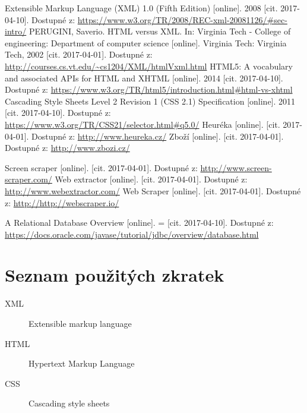 \documentclass[thesis=B,czech]{FITthesis}[2012/06/26]
\begin{document}
\begin{thebibliography}{}

	{Extensible Markup Language (XML) 1.0 (Fifth Edition) [online]. 2008 [cit. 2017-04-10]. 
	Dostupné z:
	\url{ https://www.w3.org/TR/2008/REC-xml-20081126/#sec-intro/}
	}
	{PERUGINI, Saverio. HTML versus XML. 
	In: Virginia Tech - College of engineering: Department of computer science [online]. 
	Virginia Tech: Virginia Tech, 2002 [cit. 2017-04-01]. Dostupné z: 
	\url{http://courses.cs.vt.edu/~cs1204/XML/htmlVxml.html}
	}
	{
	HTML5: A vocabulary and associated APIs for HTML and XHTML [online]. 2014 [cit. 2017-04-10]. 
	Dostupné z: 
	\url{https://www.w3.org/TR/html5/introduction.html#html-vs-xhtml}
	}
	{Cascading Style Sheets Level 2 Revision 1 (CSS 2.1) 
	Specification [online]. 2011 [cit. 2017-04-10]. 
	Dostupné z:
	\url{https://www.w3.org/TR/CSS21/selector.html#q5.0/}}	
	{Heuréka [online]. [cit. 2017-04-01]. Dostupné z:
	\url{http://www.heureka.cz/}}
	{Zboží [online]. [cit. 2017-04-01]. Dostupné z:
	\url{http://www.zbozi.cz/}}	

	
	{Screen scraper [online]. [cit. 2017-04-01]. Dostupné z:
	\url{http://www.screen-scraper.com/}}	
	{Web extractor [online]. [cit. 2017-04-01]. Dostupné z:
	\url{http://www.webextractor.com/}}		
	{Web Scraper [online]. [cit. 2017-04-01]. Dostupné z:
	\url{http://http://webscraper.io/}}		
	
	{
	A Relational Database Overview [online]. = [cit. 2017-04-10]. 
	Dostupné z: 
	\url{https://docs.oracle.com/javase/tutorial/jdbc/overview/database.html}
	}
	
\end{thebibliography}

\appendix
\chapter{Seznam použitých zkratek}
\begin{description}
	\item[XML] Extensible markup language
	\item[HTML] Hypertext Markup Language
	\item[CSS] Cascading style sheets
\end{description}
\end{document}
